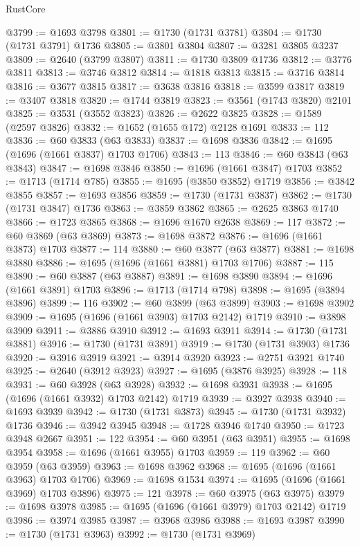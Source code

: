 \begin{lexlean}{RustCore}
\begin{coremodule}
@3799 := @1693 @3798
@3801 := @1730 (@1731 @3781)
@3804 := @1730 (@1731 @3791) @1736
@3805 := @3801 @3804
@3807 := @3281 @3805 @3237
@3809 := @2640 (@3799 @3807)
@3811 := @1730 @3809 @1736
@3812 := @3776 @3811
@3813 := @3746 @3812
@3814 := @1818 @3813
@3815 := @3716 @3814
@3816 := @3677 @3815
@3817 := @3638 @3816
@3818 := @3599 @3817
@3819 := @3407 @3818
@3820 := @1744 @3819
@3823 := @3561 (@1743 @3820) @2101
@3825 := @3531 (@3552 @3823)
@3826 := @2622 @3825
@3828 := @1589 (@2597 @3826)
@3832 := @1652 (@1655 @172) @2128 @1691
@3833 := 112
@3836 := @60 @3833 (@63 @3833)
@3837 := @1698 @3836
@3842 := @1695 (@1696 (@1661 @3837) @1703 @1706)
@3843 := 113
@3846 := @60 @3843 (@63 @3843)
@3847 := @1698 @3846
@3850 := @1696 (@1661 @3847) @1703
@3852 := @1713 (@1714 @785)
@3855 := @1695 (@3850 @3852) @1719
@3856 := @3842 @3855
@3857 := @1693 @3856
@3859 := @1730 (@1731 @3837)
@3862 := @1730 (@1731 @3847) @1736
@3863 := @3859 @3862
@3865 := @2625 @3863 @1740
@3866 := @1723 @3865
@3868 := @1696 @1670 @2638
@3869 := 117
@3872 := @60 @3869 (@63 @3869)
@3873 := @1698 @3872
@3876 := @1696 (@1661 @3873) @1703
@3877 := 114
@3880 := @60 @3877 (@63 @3877)
@3881 := @1698 @3880
@3886 := @1695 (@1696 (@1661 @3881) @1703 @1706)
@3887 := 115
@3890 := @60 @3887 (@63 @3887)
@3891 := @1698 @3890
@3894 := @1696 (@1661 @3891) @1703
@3896 := @1713 (@1714 @798)
@3898 := @1695 (@3894 @3896)
@3899 := 116
@3902 := @60 @3899 (@63 @3899)
@3903 := @1698 @3902
@3909 := @1695 (@1696 (@1661 @3903) @1703 @2142) @1719
@3910 := @3898 @3909
@3911 := @3886 @3910
@3912 := @1693 @3911
@3914 := @1730 (@1731 @3881)
@3916 := @1730 (@1731 @3891)
@3919 := @1730 (@1731 @3903) @1736
@3920 := @3916 @3919
@3921 := @3914 @3920
@3923 := @2751 @3921 @1740
@3925 := @2640 (@3912 @3923)
@3927 := @1695 (@3876 @3925)
@3928 := 118
@3931 := @60 @3928 (@63 @3928)
@3932 := @1698 @3931
@3938 := @1695 (@1696 (@1661 @3932) @1703 @2142) @1719
@3939 := @3927 @3938
@3940 := @1693 @3939
@3942 := @1730 (@1731 @3873)
@3945 := @1730 (@1731 @3932) @1736
@3946 := @3942 @3945
@3948 := @1728 @3946 @1740
@3950 := @1723 @3948 @2667
@3951 := 122
@3954 := @60 @3951 (@63 @3951)
@3955 := @1698 @3954
@3958 := @1696 (@1661 @3955) @1703
@3959 := 119
@3962 := @60 @3959 (@63 @3959)
@3963 := @1698 @3962
@3968 := @1695 (@1696 (@1661 @3963) @1703 @1706)
@3969 := @1698 @1534
@3974 := @1695 (@1696 (@1661 @3969) @1703 @3896)
@3975 := 121
@3978 := @60 @3975 (@63 @3975)
@3979 := @1698 @3978
@3985 := @1695 (@1696 (@1661 @3979) @1703 @2142) @1719
@3986 := @3974 @3985
@3987 := @3968 @3986
@3988 := @1693 @3987
@3990 := @1730 (@1731 @3963)
@3992 := @1730 (@1731 @3969)

\end{coremodule}
\end{lexlean}
